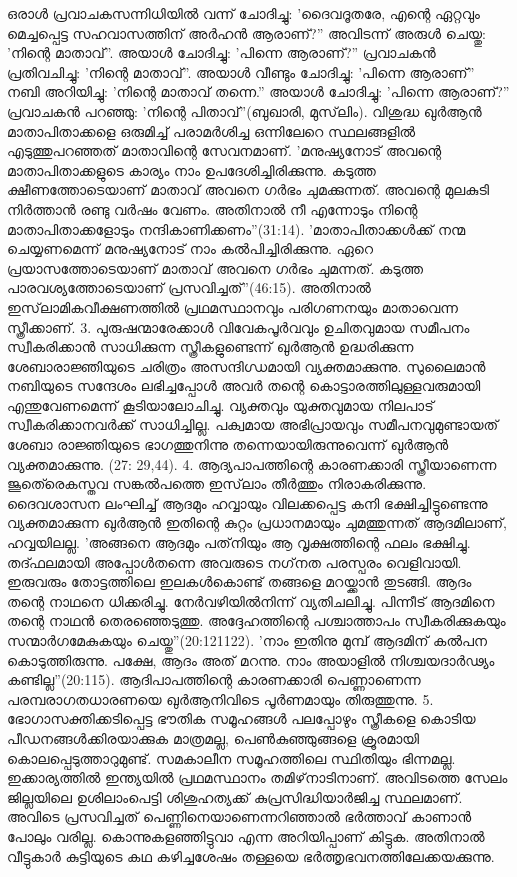 ഒരാള്‍ പ്രവാചകസന്നിധിയില്‍ വന്ന് ചോദിച്ചു: 'ദൈവദൂതരേ, എന്റെ ഏറ്റവും മെച്ചപ്പെട്ട സഹവാസത്തിന് അര്‍ഹന്‍ ആരാണ്?'' അവിടന്ന് അരുള്‍ ചെയ്തു: 'നിന്റെ മാതാവ്''. അയാള്‍ ചോദിച്ചു: 'പിന്നെ ആരാണ്?'' പ്രവാചകന്‍ പ്രതിവചിച്ചു: 'നിന്റെ മാതാവ്''. അയാള്‍ വീണ്ടും ചോദിച്ചു: 'പിന്നെ ആരാണ്'' നബി അറിയിച്ചു: 'നിന്റെ മാതാവ് തന്നെ.'' അയാള്‍ ചോദിച്ചു: 'പിന്നെ ആരാണ്?'' പ്രവാചകന്‍ പറഞ്ഞു: 'നിന്റെ പിതാവ്''(ബുഖാരി, മുസ്‌ലിം).
വിശുദ്ധ ഖുര്‍ആന്‍ മാതാപിതാക്കളെ ഒരുമിച്ച് പരാമര്‍ശിച്ച ഒന്നിലേറെ സ്ഥലങ്ങളില്‍ എടുത്തുപറഞ്ഞത് മാതാവിന്റെ സേവനമാണ്. 'മനുഷ്യനോട് അവന്റെ മാതാപിതാക്കളുടെ കാര്യം നാം ഉപദേശിച്ചിരിക്കുന്നു. കടുത്ത ക്ഷീണത്തോടെയാണ് മാതാവ് അവനെ ഗര്‍ഭം ചുമക്കുന്നത്. അവന്റെ മുലകുടി നിര്‍ത്താന്‍ രണ്ടു വര്‍ഷം വേണം. അതിനാല്‍ നീ എന്നോടും നിന്റെ മാതാപിതാക്കളോടും നന്ദികാണിക്കണം''(31:14). 'മാതാപിതാക്കള്‍ക്ക് നന്മ ചെയ്യണമെന്ന് മനുഷ്യനോട് നാം കല്‍പിച്ചിരിക്കുന്നു. ഏറെ പ്രയാസത്തോടെയാണ് മാതാവ് അവനെ ഗര്‍ഭം ചുമന്നത്. കടുത്ത പാരവശ്യത്തോടെയാണ് പ്രസവിച്ചത്''(46:15). അതിനാല്‍ ഇസ്‌ലാമികവീക്ഷണത്തില്‍ പ്രഥമസ്ഥാനവും പരിഗണനയും മാതാവെന്ന സ്ത്രീക്കാണ്.
3. പുരുഷന്മാരേക്കാള്‍ വിവേകപൂര്‍വവും ഉചിതവുമായ സമീപനം സ്വീകരിക്കാന്‍ സാധിക്കുന്ന സ്ത്രീകളുണ്ടെന്ന് ഖുര്‍ആന്‍ ഉദ്ധരിക്കുന്ന ശേബാരാജ്ഞിയുടെ ചരിത്രം അസന്ദിഗ്ധമായി വ്യക്തമാക്കുന്നു. സുലൈമാന്‍ നബിയുടെ സന്ദേശം ലഭിച്ചപ്പോള്‍ അവര്‍ തന്റെ കൊട്ടാരത്തിലുള്ളവരുമായി എന്തുവേണമെന്ന് കൂടിയാലോചിച്ചു. വ്യക്തവും യുക്തവുമായ നിലപാട് സ്വീകരിക്കാനവര്‍ക്ക് സാധിച്ചില്ല. പക്വമായ അഭിപ്രായവും സമീപനവുമുണ്ടായത് ശേബാ രാജ്ഞിയുടെ ഭാഗത്തുനിന്നു തന്നെയായിരുന്നുവെന്ന് ഖുര്‍ആന്‍ വ്യക്തമാക്കുന്നു. (27: 29,44).
4. ആദ്യപാപത്തിന്റെ കാരണക്കാരി സ്ത്രീയാണെന്ന ജൂതെ്രെകസ്തവ സങ്കല്‍പത്തെ ഇസ്‌ലാം തീര്‍ത്തും നിരാകരിക്കുന്നു. ദൈവശാസന ലംഘിച്ച് ആദമും ഹവ്വായും വിലക്കപ്പെട്ട കനി ഭക്ഷിച്ചിട്ടുണ്ടെന്നു വ്യക്തമാക്കുന്ന ഖുര്‍ആന്‍ ഇതിന്റെ കുറ്റം പ്രധാനമായും ചുമത്തുന്നത് ആദമിലാണ്, ഹവ്വയിലല്ല. 'അങ്ങനെ ആദമും പത്‌നിയും ആ വൃക്ഷത്തിന്റെ ഫലം ഭക്ഷിച്ചു. തദ്ഫലമായി അപ്പോള്‍തന്നെ അവരുടെ നഗ്‌നത പരസ്പരം വെളിവായി. ഇരുവരും തോട്ടത്തിലെ ഇലകള്‍കൊണ്ട് തങ്ങളെ മറയ്ക്കാന്‍ തുടങ്ങി. ആദം തന്റെ നാഥനെ ധിക്കരിച്ചു. നേര്‍വഴിയില്‍നിന്ന് വ്യതിചലിച്ചു. പിന്നീട് ആദമിനെ തന്റെ നാഥന്‍ തെരഞ്ഞെടുത്തു. അദ്ദേഹത്തിന്റെ പശ്ചാത്താപം സ്വീകരിക്കുകയും സന്മാര്‍ഗമേകുകയും ചെയ്തു''(20:121122).
'നാം ഇതിനു മുമ്പ് ആദമിന് കല്‍പന കൊടുത്തിരുന്നു. പക്ഷേ, ആദം അത് മറന്നു. നാം അയാളില്‍ നിശ്ചയദാര്‍ഢ്യം കണ്ടില്ല''(20:115). ആദിപാപത്തിന്റെ കാരണക്കാരി പെണ്ണാണെന്ന പരമ്പരാഗതധാരണയെ ഖുര്‍ആനിവിടെ പൂര്‍ണമായും തിരുത്തുന്നു.
5. ഭോഗാസക്തിക്കടിപ്പെട്ട ഭൗതിക സമൂഹങ്ങള്‍ പലപ്പോഴും സ്ത്രീകളെ കൊടിയ പീഡനങ്ങള്‍ക്കിരയാക്കുക മാത്രമല്ല, പെണ്‍കുഞ്ഞുങ്ങളെ ക്രൂരമായി കൊലപ്പെടുത്താറുമുണ്ട്. സമകാലീന സമൂഹത്തിലെ സ്ഥിതിയും ഭിന്നമല്ല. ഇക്കാര്യത്തില്‍ ഇന്ത്യയില്‍ പ്രഥമസ്ഥാനം തമിഴ്‌നാടിനാണ്. അവിടത്തെ സേലം ജില്ലയിലെ ഉശിലാംപെട്ടി ശിശുഹത്യക്ക് കുപ്രസിദ്ധിയാര്‍ജിച്ച സ്ഥലമാണ്. അവിടെ പ്രസവിച്ചത് പെണ്ണിനെയാണെന്നറിഞ്ഞാല്‍ ഭര്‍ത്താവ് കാണാന്‍ പോലും വരില്ല. കൊന്നുകളഞ്ഞിട്ടുവാ എന്ന അറിയിപ്പാണ് കിട്ടുക. അതിനാല്‍ വീട്ടുകാര്‍ കുട്ടിയുടെ കഥ കഴിച്ചശേഷം തള്ളയെ ഭര്‍ത്തൃഭവനത്തിലേക്കയക്കുന്നു.
